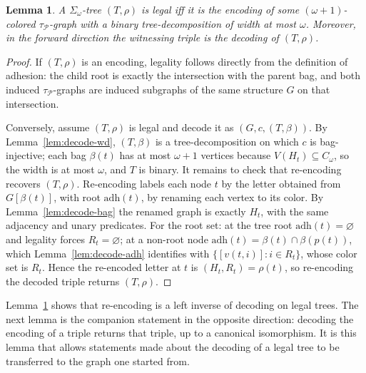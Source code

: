 \documentclass[11pt]{article}
\newtheorem{lemma}[theorem]{Lemma}
\theoremstyle{definition}
\newcommand{\adh}{\mathrm{adh}}
\newcommand{\Pred}{\mathcal P}
\begin{document}
\begin{lemma}\label{lem:legal-iff-enc}
A \(\Sigma_\omega\)-tree \((T,\rho)\) is legal iff it is the encoding of some
\((\omega+1)\)-colored \(\tau_{\Pred}\)-graph with a binary tree-decomposition
of width at most \(\omega\).  Moreover, in the forward direction the witnessing
triple is the decoding of \((T,\rho)\).
\end{lemma}

\begin{proof}
If \((T,\rho)\) is an encoding, legality follows directly from the definition of
adhesion: the child root is exactly the intersection with the parent bag, and
both induced \(\tau_{\Pred}\)-graphs are induced subgraphs of the same structure
\(G\) on that intersection.

Conversely, assume \((T,\rho)\) is legal and decode it as \((G,c,(T,\beta))\).
By Lemma~\ref{lem:decode-wd}, \((T,\beta)\) is a tree-decomposition on which \(c\)
is bag-injective; each bag \(\beta(t)\) has at most \(\omega+1\) vertices because
\(V(H_t)\subseteq C_\omega\), so the width is at most \(\omega\), and \(T\) is
binary.  It remains to check that re-encoding recovers \((T,\rho)\).  Re-encoding
labels each node \(t\) by the letter obtained from \(G[\beta(t)]\), with root
\(\adh(t)\), by renaming each vertex to its color.  By Lemma~\ref{lem:decode-bag}
the renamed graph is exactly \(H_t\), with the same adjacency and unary
predicates.  For the root set: at the tree root \(\adh(t)=\varnothing\) and
legality forces \(R_t=\varnothing\); at a non-root node
\(\adh(t)=\beta(t)\cap\beta(p(t))\), which Lemma~\ref{lem:decode-adh} identifies
with \(\{[v(t,i)]:i\in R_t\}\), whose color set is \(R_t\).  Hence the re-encoded
letter at \(t\) is \((H_t,R_t)=\rho(t)\), so re-encoding the decoded triple returns
\((T,\rho)\).
\end{proof}

Lemma~\ref{lem:legal-iff-enc} shows that re-encoding is a left inverse of
decoding on legal trees.  The next lemma is the companion statement in the
opposite direction: decoding the encoding of a triple returns that triple, up
to a canonical isomorphism.  It is this lemma that allows statements made
about the decoding of a legal tree to be transferred to the graph one started
from.
\end{document}
